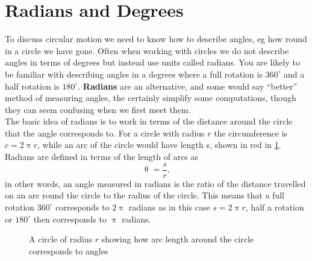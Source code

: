 \documentclass[a4paper,12pt]{book}
\begin{document}
\section{Radians and Degrees}
To discuss circular motion we need to know how to describe angles, eg how round in a circle we have gone. Often when working with circles we do not describe angles in terms of degrees but instead use units called radians.  You are likely to be familiar with describing angles in a degrees where a full rotation is $360^{\circ}$ and a half rotation is $180^{\circ}$. \textbf{Radians} are an alternative, and some would say ``better'' method of measuring angles, the certainly simplify some computations, though they can seem confusing when we first meet them.\\

The basic idea of radians is to work in terms of the distance around the circle that the angle corresponds to.  For a circle with radius $r$ the circumference is $c=2\uppi r$, while an arc of the circle would have length s, shown in red in \cref{fig: radians}. Radians are defined in terms of the length of arcs as
\begin{equation}
\uptheta =\frac{s}{r},
\label{eq: definition of radians}
\end{equation}
in other words, an angle measured in radians is the ratio of the distance travelled on an arc round the circle to the radius of the circle. 
This means that a full rotation $360^{\circ}$ corresponds to $2\uppi$ radians as in this case $s=2\uppi r$, half a rotation or $180^{\circ}$ then corresponds to $\uppi$ radians. 

\begin{figure}[ht]
    \centering
    \caption{A circle of radius $r$ showing how arc length around the circle corresponds to angles}
        \label{fig: radians}
\end{figure}
\end{document}
